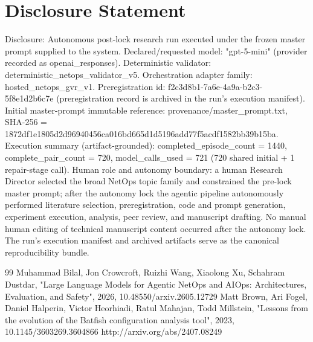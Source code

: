 \documentclass[conference]{IEEEtran}
\begin{document}
\section*{Disclosure Statement}
Disclosure: Autonomous post-lock research run executed under the frozen master prompt supplied to the system. Declared/requested model: "gpt-5-mini" (provider recorded as openai\_responses). Deterministic validator: deterministic\_netops\_validator\_v5. Orchestration adapter family: hosted\_netops\_gvr\_v1. Preregistration id: f2c3d8b1-7a6e-4a9a-b2c3-5f8e1d2b6c7e (preregistration record is archived in the run's execution manifest). Initial master-prompt immutable reference: provenance/master\_prompt.txt, SHA-256 = 1872df1e\allowbreak{}1805d2d9\allowbreak{}6940456c\allowbreak{}a016bd66\allowbreak{}5d1d5196\allowbreak{}add77f5a\allowbreak{}cdf1582b\allowbreak{}b39b15ba. Execution summary (artifact-grounded): completed\_episode\_count = 1440, complete\_pair\_count = 720, model\_calls\_used = 721 (720 shared initial + 1 repair-stage call). Human role and autonomy boundary: a human Research Director selected the broad NetOps topic family and constrained the pre-lock master prompt; after the autonomy lock the agentic pipeline autonomously performed literature selection, preregistration, code and prompt generation, experiment execution, analysis, peer review, and manuscript drafting. No manual human editing of technical manuscript content occurred after the autonomy lock. The run's execution manifest and archived artifacts serve as the canonical reproducibility bundle.

\begin{thebibliography}{99}
 Muhammad Bilal, Jon Crowcroft, Ruizhi Wang, Xiaolong Xu, Schahram Dustdar, "Large Language Models for Agentic NetOps and AIOps: Architectures, Evaluation, and Safety", 2026, 10.48550/arxiv.2605.12729
 Matt Brown, Ari Fogel, Daniel Halperin, Victor Heorhiadi, Ratul Mahajan, Todd Millstein, "Lessons from the evolution of the Batfish configuration analysis tool", 2023, 10.1145/3603269.3604866
 http://arxiv.org/abs/2407.08249
\end{thebibliography}
\end{document}
